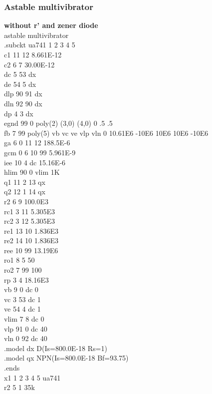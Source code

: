 \documentclass[12pt]{article}
\begin{document}
\subsubsection{Astable multivibrator}
\textbf{without r' and zener diode\\}
astable multivibrator\\
.subckt ua741    1  2  3  4  5\\
c1   11 12 8.661E-12\\
c2    6  7 30.00E-12\\
dc    5 53 dx\\
de   54  5 dx\\
dlp  90 91 dx\\
dln  92 90 dx\\
dp    4  3 dx\\
egnd 99  0 poly(2) (3,0) (4,0) 0 .5 .5\\
fb    7 99 poly(5) vb vc ve vlp vln 0 10.61E6 -10E6 10E6 10E6 -10E6\\
ga    6  0 11 12 188.5E-6\\
gcm   0  6 10 99 5.961E-9\\
iee  10  4 dc 15.16E-6\\
hlim 90  0 vlim 1K\\
q1   11  2 13 qx\\
q2   12  1 14 qx\\
r2    6  9 100.0E3\\
rc1   3 11 5.305E3\\
rc2   3 12 5.305E3\\
re1  13 10 1.836E3\\
re2  14 10 1.836E3\\
ree  10 99 13.19E6\\
ro1   8  5 50\\
ro2   7 99 100\\
rp    3  4 18.16E3\\
vb    9  0 dc 0\\
vc    3 53 dc 1\\
ve   54  4 dc 1\\
\newpage
vlim  7  8 dc 0\\
vlp  91  0 dc 40\\
vln   0 92 dc 40\\
.model dx D(Is=800.0E-18 Rs=1)\\
.model qx NPN(Is=800.0E-18 Bf=93.75)\\
.ends\\
x1 1 2 3 4 5 ua741\\
r2 5 1 35k\\
\end{document}
